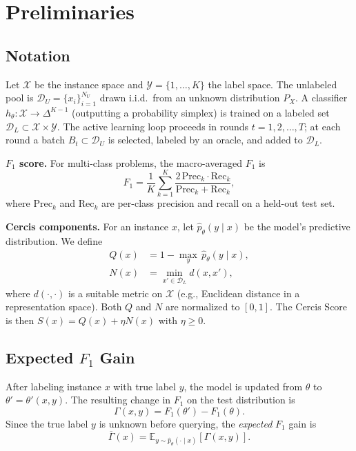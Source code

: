 \documentclass[12pt,a4paper]{article}
\newcommand{\E}{\mathbb{E}}
\newcommand{\cX}{\mathcal{X}}
\newcommand{\cY}{\mathcal{Y}}
\newcommand{\cD}{\mathcal{D}}
\begin{document}
\section{Preliminaries}

\subsection{Notation}

Let $\cX$ be the instance space and $\cY=\{1,\dots,K\}$ the label space.
The unlabeled pool is $\cD_U=\{x_i\}_{i=1}^{N_U}$ drawn i.i.d.\ from an
unknown distribution $P_X$.  A classifier $h_\theta:\cX\to\Delta^{K-1}$
(outputting a probability simplex) is trained on a labeled set
$\cD_L\subset\cX\times\cY$.  The active learning loop proceeds in rounds
$t=1,2,\dots,T$; at each round a batch $B_t\subset\cD_U$ is selected,
labeled by an oracle, and added to $\cD_L$.

\medskip\noindent
\textbf{$F_1$ score.}
For multi-class problems, the macro-averaged $F_1$ is
\begin{equation}\label{eq:f1-def}
    F_1 = \frac{1}{K}\sum_{k=1}^{K}
    \frac{2\,\text{Prec}_k\cdot\text{Rec}_k}{\text{Prec}_k+\text{Rec}_k},
\end{equation}
where $\text{Prec}_k$ and $\text{Rec}_k$ are per-class precision and recall
on a held-out test set.

\medskip\noindent
\textbf{Cercis components.}
For an instance $x$, let $\hat{p}_\theta(y\mid x)$ be the model's predictive
distribution.  We define
\begin{align}
    Q(x) &= 1 - \max_{y}\,\hat{p}_\theta(y\mid x),
           \label{eq:quality} \\[4pt]
    N(x) &= \min_{x'\in\cD_L} d(x,x'),
           \label{eq:novelty}
\end{align}
where $d(\cdot,\cdot)$ is a suitable metric on $\cX$ (e.g., Euclidean
distance in a representation space).  Both $Q$ and $N$ are normalized to
$[0,1]$.  The Cercis Score is then $S(x)=Q(x)+\eta N(x)$ with
$\eta\geq0$.

\subsection{Expected $F_1$ Gain}

After labeling instance $x$ with true label $y$, the model is updated from
$\theta$ to $\theta'=\theta'(x,y)$.  The resulting change in $F_1$ on the
test distribution is
\begin{equation}\label{eq:gain}
    \Gamma(x,y) = F_1(\theta') - F_1(\theta).
\end{equation}
Since the true label $y$ is unknown before querying, the \emph{expected}
$F_1$ gain is
\begin{equation}\label{eq:expected-gain}
    \overline{\Gamma}(x) =
    \E_{y\sim\hat{p}_\theta(\cdot\mid x)}[\Gamma(x,y)].
\end{equation}
\end{document}
